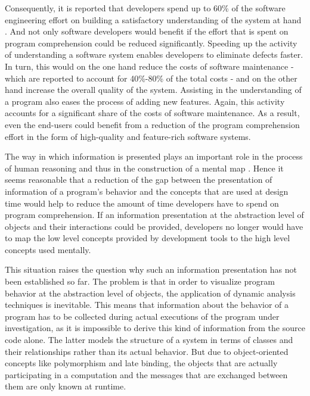 Consequently, it is reported that developers spend up to 60\% of the software engineering effort on building a satisfactory understanding of the system at hand \cite{corbi_program_1989, basili_evolving_1997, ducasse_class_2005, rothlisberger_feature_2007, cornelissen_execution_2008}.
And not only software developers would benefit if the effort that is spent on program comprehension could be reduced significantly.
Speeding up the activity of understanding a software system enables developers to eliminate defects faster.
In turn, this would on the one hand reduce the costs of software maintenance - which are reported to account for 40\%-80\% of the total costs \cite{glass_frequently_2001} - and on the other hand increase the overall quality of the system.
Assisting in the understanding of a program also eases the process of adding new features.
Again, this activity accounts for a significant share of the costs of software maintenance.
As a result, even the end-users could benefit from a reduction of the program comprehension effort in the form of high-quality and feature-rich software systems.

The way in which information is presented plays an important role in the process of human reasoning and thus in the construction of a mental map \cite{diehl_software_2007}.
Hence it seems reasonable that a reduction of the gap between the presentation of information of a program's behavior and the concepts that are used at design time would help to reduce the amount of time developers have to spend on program comprehension.
If an information presentation at the abstraction level of objects and their interactions could be provided, developers no longer would have to map the low level concepts provided by development tools to the high level concepts used mentally.

This situation raises the question why such an information presentation has not been established so far.
The problem is that in order to visualize program behavior at the abstraction level of objects, the application of dynamic analysis techniques is inevitable.
This means that information about the behavior of a program has to be collected during actual executions of the program under investigation, as it is impossible to derive this kind of information from the source code alone.
The latter models the structure of a system in terms of classes and their relationships rather than its actual behavior.
But due to object-oriented concepts like polymorphism and late binding, the objects that are actually participating in a computation and the messages that are exchanged between them are only known at runtime.

